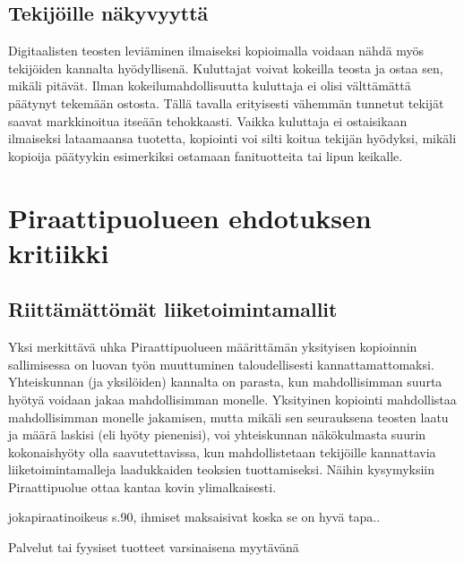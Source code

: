 \documentclass[titlepage,12pt]{article}
\begin{document}
\subsection{Tekijöille näkyvyyttä}

Digitaalisten teosten leviäminen ilmaiseksi kopioimalla voidaan nähdä
myös tekijöiden kannalta hyödyllisenä.  Kuluttajat voivat kokeilla
teosta ja ostaa sen, mikäli pitävät.  Ilman kokeilumahdollisuutta
kuluttaja ei olisi välttämättä päätynyt tekemään ostosta.  Tällä
tavalla erityisesti vähemmän tunnetut tekijät saavat markkinoitua
itseään tehokkaasti.  Vaikka kuluttaja ei ostaisikaan ilmaiseksi
lataamaansa tuotetta, kopiointi voi silti koitua tekijän hyödyksi,
mikäli kopioija päätyykin esimerkiksi ostamaan fanituotteita tai lipun
keikalle.


\section{Piraattipuolueen ehdotuksen kritiikki}

\subsection{Riittämättömät liiketoimintamallit}

Yksi merkittävä uhka Piraattipuolueen määrittämän yksityisen
kopioinnin sallimisessa on luovan työn muuttuminen taloudellisesti
kannattamattomaksi.  Yhteiskunnan (ja yksilöiden) kannalta on parasta,
kun mahdollisimman suurta hyötyä voidaan jakaa mahdollisimman monelle.
Yksityinen kopiointi mahdollistaa mahdollisimman monelle jakamisen,
mutta mikäli sen seurauksena teosten laatu ja määrä laskisi (eli hyöty
pienenisi), voi yhteiskunnan näkökulmasta suurin kokonaishyöty olla
saavutettavissa, kun mahdollistetaan tekijöille kannattavia
liiketoimintamalleja laadukkaiden teoksien tuottamiseksi.  Näihin
kysymyksiin Piraattipuolue ottaa kantaa kovin ylimalkaisesti.



jokapiraatinoikeus s.90, ihmiset maksaisivat koska se on hyvä tapa..


Palvelut tai fyysiset tuotteet varsinaisena myytävänä
\end{document}
